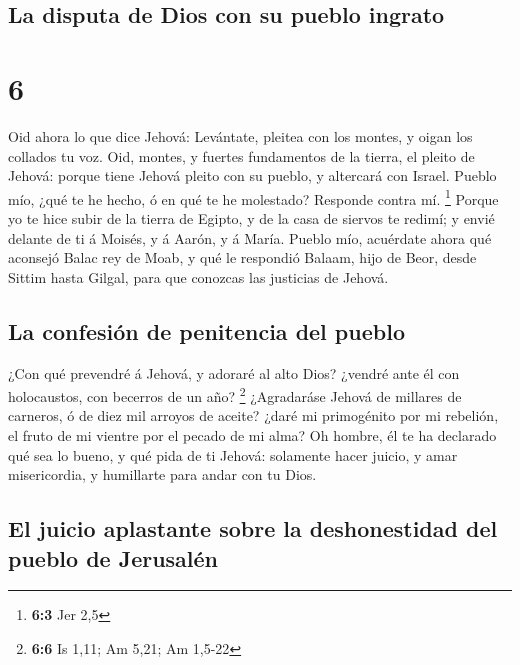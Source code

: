 \hypertarget{la-disputa-de-dios-con-su-pueblo-ingrato}{%
\subsection{La disputa de Dios con su pueblo
ingrato}\label{la-disputa-de-dios-con-su-pueblo-ingrato}}

\hypertarget{section-5}{%
\section{6}\label{section-5}}

 Oid ahora lo que dice Jehová: Levántate, pleitea con los
montes, y oigan los collados tu voz.  Oid, montes, y
fuertes fundamentos de la tierra, el pleito de Jehová: porque tiene
Jehová pleito con su pueblo, y altercará con Israel. 
Pueblo mío, ¿qué te he hecho, ó en qué te he molestado? Responde contra
mí. \footnote{\textbf{6:3} Jer 2,5}  Porque yo te hice
subir de la tierra de Egipto, y de la casa de siervos te redimí; y envié
delante de ti á Moisés, y á Aarón, y á María.  Pueblo mío,
acuérdate ahora qué aconsejó Balac rey de Moab, y qué le respondió
Balaam, hijo de Beor, desde Sittim hasta Gilgal, para que conozcas las
justicias de Jehová.

\hypertarget{la-confesiuxf3n-de-penitencia-del-pueblo}{%
\subsection{La confesión de penitencia del
pueblo}\label{la-confesiuxf3n-de-penitencia-del-pueblo}}

 ¿Con qué prevendré á Jehová, y adoraré al alto Dios?
¿vendré ante él con holocaustos, con becerros de un año? \footnote{\textbf{6:6}
  Is 1,11; Am 5,21; Am 1,5-22}  ¿Agradaráse Jehová de
millares de carneros, ó de diez mil arroyos de aceite? ¿daré mi
primogénito por mi rebelión, el fruto de mi vientre por el pecado de mi
alma?  Oh hombre, él te ha declarado qué sea lo bueno, y
qué pida de ti Jehová: solamente hacer juicio, y amar misericordia, y
humillarte para andar con tu Dios.

\hypertarget{el-juicio-aplastante-sobre-la-deshonestidad-del-pueblo-de-jerusaluxe9n}{%
\subsection{El juicio aplastante sobre la deshonestidad del pueblo de
Jerusalén}\label{el-juicio-aplastante-sobre-la-deshonestidad-del-pueblo-de-jerusaluxe9n}}

